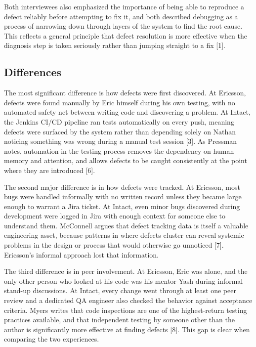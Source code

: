 \documentclass[sigconf]{acmart}
\begin{document}
Both interviewees also emphasized the importance of being able to reproduce a defect reliably before attempting to fix it, and both described debugging as a process of narrowing down through layers of the system to find the root cause. This reflects a general principle that defect resolution is more effective when the diagnosis step is taken seriously rather than jumping straight to a fix [1].

\subsection{Differences}

The most significant difference is how defects were first discovered. At Ericsson, defects were found manually by Eric himself during his own testing, with no automated safety net between writing code and discovering a problem. At Intact, the Jenkins CI/CD pipeline ran tests automatically on every push, meaning defects were surfaced by the system rather than depending solely on Nathan noticing something was wrong during a manual test session [3]. As Pressman notes, automation in the testing process removes the dependency on human memory and attention, and allows defects to be caught consistently at the point where they are introduced [6].

The second major difference is in how defects were tracked. At Ericsson, most bugs were handled informally with no written record unless they became large enough to warrant a Jira ticket. At Intact, even minor bugs discovered during development were logged in Jira with enough context for someone else to understand them. McConnell argues that defect tracking data is itself a valuable engineering asset, because patterns in where defects cluster can reveal systemic problems in the design or process that would otherwise go unnoticed [7]. Ericsson's informal approach lost that information.

The third difference is in peer involvement. At Ericsson, Eric was alone, and the only other person who looked at his code was his mentor Yash during informal stand-up discussions. At Intact, every change went through at least one peer review and a dedicated QA engineer also checked the behavior against acceptance criteria. Myers writes that code inspections are one of the highest-return testing practices available, and that independent testing by someone other than the author is significantly more effective at finding defects [8]. This gap is clear when comparing the two experiences.
\end{document}
